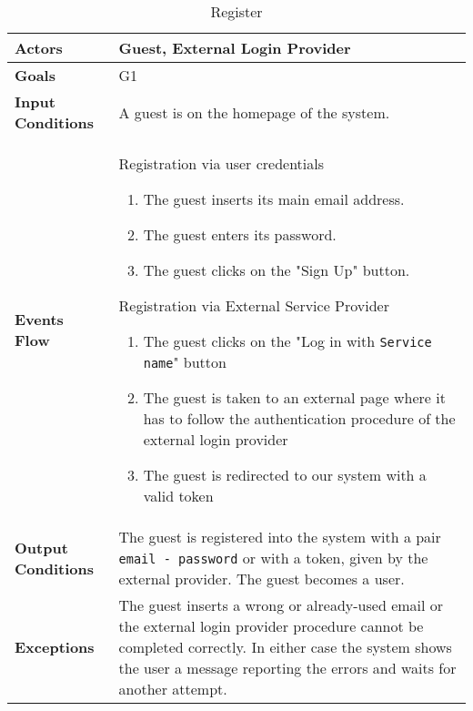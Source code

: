 

\begin{table}[H]
	\centering
	\def\arraystretch{1.5}
	\begin{tabular}{|p{7cm}|p{7cm}|}
		\hline
		\textbf{Actors}            & Guest, External Login Provider		    \\ \hline
		\textbf{Goals}             & G1           \\ \hline
		\textbf{Input Conditions}  & A guest is on the homepage of the system.           \\ \hline
		\textbf{Events Flow}       &   
		Registration via user credentials
		\begin{enumerate}
			\item The guest inserts its main email address.
			\item The guest enters its password.
			\item The guest clicks on the "Sign Up" button.
		\end{enumerate}
		Registration via External Service Provider
		\begin{enumerate}
			\item The guest clicks on the "Log in with \texttt{Service name}" button
			\item The guest is taken to an external page where it has to follow the authentication procedure of the external login provider
			\item The guest is redirected to our system with a valid token
		\end{enumerate}       \\ \hline
		\textbf{Output Conditions} & The guest is registered into the system with a pair \texttt{email - password} or with a token, given by the external provider. The guest becomes a user.          \\ \hline
		\textbf{Exceptions}        & The guest inserts a wrong or already-used email or the external login provider procedure cannot be completed correctly. In either case the system shows the user a message reporting the errors and waits for another attempt.            \\ \hline
	\end{tabular}
	\caption{Register}
\end{table}

